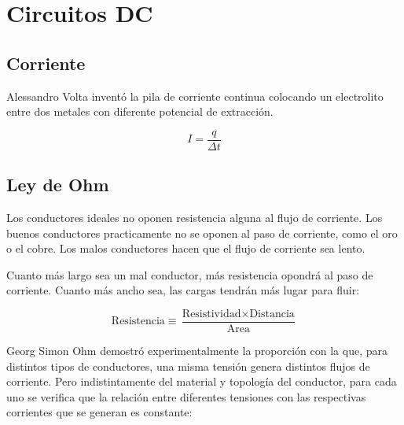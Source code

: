 \chapter{Circuitos DC}

\renewcommand{\voltage}{V}
\renewcommand{\current}{I}

\section{Corriente}

Alessandro Volta inventó la pila de corriente continua colocando un electrolito entre dos metales con diferente potencial de extracción.

\begin{mdframed}[style=MyFrame1]
    \begin{defn}
    \end{defn}
    \begin{equation*}
        I = \frac{q}{\Delta t}
    \end{equation*}
\end{mdframed}


\section{Ley de Ohm}

Los conductores ideales no oponen resistencia alguna al flujo de corriente.
Los buenos conductores practicamente no se oponen al paso de corriente, como el oro o el cobre.
Los malos conductores hacen que el flujo de corriente sea lento.

Cuanto más largo sea un mal conductor, más resistencia opondrá al paso de corriente.
Cuanto más ancho sea, las cargas tendrán más lugar para fluir:

\begin{equation*}
    \text{Resistencia} \equiv \frac{\text{Resistividad} \times \text{Distancia}}{\text{Area}}
\end{equation*}

Georg Simon Ohm demostró experimentalmente la proporción con la que, para distintos tipos de conductores, una misma tensión genera distintos flujos de corriente.
Pero indistintamente del material y topología del conductor, para cada uno se verifica que la relación entre diferentes tensiones con las respectivas corrientes que se generan es constante:

